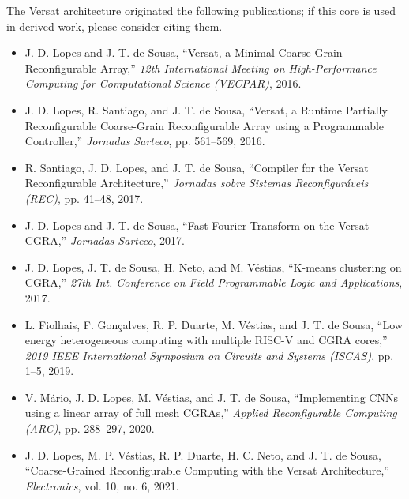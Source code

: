 %

The Versat architecture originated the following publications; if this
core is used in derived work, please consider citing them.

\begin{itemize}
  \itemsep-0.5em
  \item J. D. Lopes and J. T. de Sousa, ``Versat, a Minimal Coarse-Grain
    Reconfigurable Array,'' \emph{12th International Meeting on
    High-Performance Computing for Computational Science (VECPAR)}, 2016.
  \item J. D. Lopes, R. Santiago, and J. T. de Sousa, ``Versat, a Runtime
    Partially Reconfigurable Coarse-Grain Reconfigurable Array using a
    Programmable Controller,'' \emph{Jornadas Sarteco}, pp. 561--569, 2016.
  \item R. Santiago, J. D. Lopes, and J. T. de Sousa, ``Compiler for the
    Versat Reconfigurable Architecture,'' \emph{Jornadas sobre Sistemas
    Reconfigur\'aveis (REC)}, pp. 41--48, 2017.
  \item J. D. Lopes and J. T. de Sousa, ``Fast Fourier Transform on the
    Versat CGRA,'' \emph{Jornadas Sarteco}, 2017.
  \item J. D. Lopes, J. T. de Sousa, H. Neto, and M. V\'estias, ``K-means
    clustering on CGRA,'' \emph{27th Int. Conference on Field Programmable
    Logic and Applications}, 2017.
  \item L. Fiolhais, F. Gon\c{c}alves, R. P. Duarte, M. V\'estias, and J. T.
    de Sousa, ``Low energy heterogeneous computing with multiple RISC-V and
    CGRA cores,'' \emph{2019 IEEE International Symposium on Circuits and
    Systems (ISCAS)}, pp. 1--5, 2019.
  \item V. M\'ario, J. D. Lopes, M. V\'estias, and J. T. de Sousa,
    ``Implementing CNNs using a linear array of full mesh CGRAs,''
    \emph{Applied Reconfigurable Computing (ARC)}, pp. 288--297, 2020.
  \item J. D. Lopes, M. P. V\'estias, R. P. Duarte, H. C. Neto, and J. T. de
    Sousa, ``Coarse-Grained Reconfigurable Computing with the Versat
    Architecture,'' \emph{Electronics}, vol. 10, no. 6, 2021.
\end{itemize}
